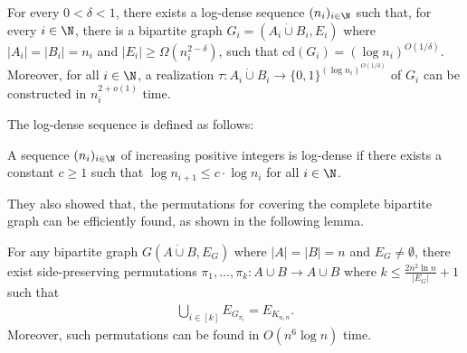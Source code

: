 \begin{theorem} \label{thm:dense-cd}
For every $0<\delta < 1$, there exists a log-dense sequence $(n_i)_{i\in \N}$ such that, for every $i\in \N$, there is a bipartite graph $G_i=(A_i \dot \cup B_i, E_i)$ where $|A_i|=|B_i|=n_i$ and $|E_i|\ge \Omega(n_i^{2-\delta})$, such that $\mathrm{cd}(G_i)=(\log n_i)^{O(1/\delta)}$. Moreover, for all $i\in \N$, a realization $\tau:A_i\dot \cup B_i\rightarrow \{0,1\}^{(\log n_i)^{O(1/\delta)}}$ of $G_i$ can be constructed in $n_i^{2+o(1)}$ time.
\end{theorem}
\noindent The log-dense sequence is defined as follows:
\begin{definition}
A sequence $(n_i)_{i\in \N}$ of increasing positive integers is log-dense if there exists a constant $c\ge 1$ such that $\log n_{i+1}\le c\cdot \log n_i$ for all $i\in \N$.
\end{definition}
They also showed that, the permutations for covering the complete bipartite graph can be efficiently found, as shown in the following lemma.
\begin{lemma} \label{lem:cover}
For any bipartite graph $G(A\dot \cup B, E_G)$ where $|A|=|B|=n$ and $E_G\ne \emptyset$, there exist side-preserving permutations $\pi_1,\dots, \pi_k:A\cup B\rightarrow A\cup B$ where $k\leq \frac{2n^2\ln n}{|E_G|}+1$ such that
\begin{align}
    \underset{i\in [k]}{\bigcup} E_{G_{\pi_i}} = E_{K_{n,n}}.
\end{align}
Moreover, such permutations can be found in $O(n^6\log n)$ time.
\end{lemma}

